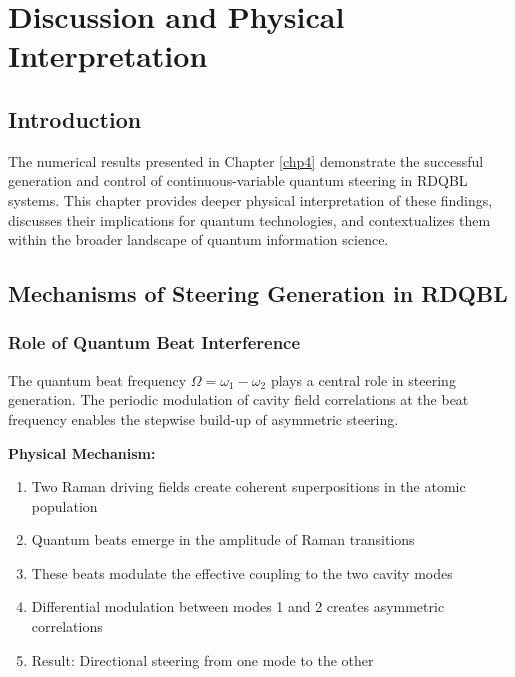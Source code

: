 
\chapter{Discussion and Physical Interpretation}
\label{chp5}
\newpage

\section{Introduction}

The numerical results presented in Chapter \ref{chp4} demonstrate the successful generation and control of continuous-variable quantum steering in RDQBL systems. This chapter provides deeper physical interpretation of these findings, discusses their implications for quantum technologies, and contextualizes them within the broader landscape of quantum information science.

\section{Mechanisms of Steering Generation in RDQBL}

\subsection{Role of Quantum Beat Interference}

The quantum beat frequency $\Omega = \omega_1 - \omega_2$ plays a central role in steering generation. The periodic modulation of cavity field correlations at the beat frequency enables the stepwise build-up of asymmetric steering.

\textbf{Physical Mechanism:}
\begin{enumerate}
	\item Two Raman driving fields create coherent superpositions in the atomic population
	\item Quantum beats emerge in the amplitude of Raman transitions
	\item These beats modulate the effective coupling to the two cavity modes
	\item Differential modulation between modes 1 and 2 creates asymmetric correlations
	\item Result: Directional steering from one mode to the other
\end{enumerate}

